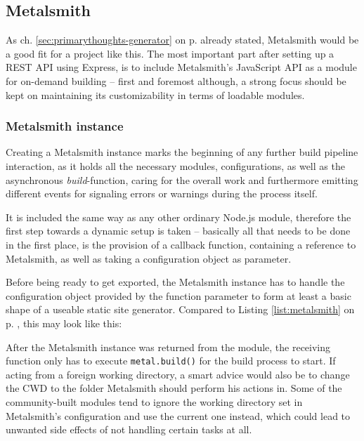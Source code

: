 \subsection{Metalsmith}
\label{sec:foundation-metalsmith}

As ch. \ref{sec:primarythoughts-generator} on p. \pageref{sec:primarythoughts-generator} already stated, Metalsmith would be a good fit for a project like this. The most important part after setting up a REST API using Express, is to include Metalsmith's JavaScript API as a module for on-demand building -- first and foremost although, a strong focus should be kept on maintaining its customizability in terms of loadable modules.

\subsubsection{Metalsmith instance}
Creating a Metalsmith instance marks the beginning of any further build pipeline interaction, as it holds all the necessary modules, configurations, as well as the asynchronous \emph{build}-function, caring for the overall work and furthermore emitting different events for signaling errors or warnings during the process itself.

It is included the same way as any other ordinary Node.js module, therefore the first step towards a dynamic setup is taken -- basically all that needs to be done in the first place, is the provision of a callback function, containing a reference to Metalsmith, as well as taking a configuration object as parameter.

Before being ready to get exported, the Metalsmith instance has to handle the configuration object provided by the function parameter to form at least a basic shape of a useable static site generator. Compared to Listing \ref{list:metalsmith} on p. \pageref{list:metalsmith}, this may look like this:



After the Metalsmith instance was returned from the module, the receiving function only has to execute \texttt{metal.build()} for the build process to start. If acting from a foreign working directory, a smart advice would also be to change the CWD to the folder Metalsmith should perform his actions in. Some of the community-built modules tend to ignore the working directory set in Metalsmith's configuration and use the current one instead, which could lead to unwanted side effects of not handling certain tasks at all.

